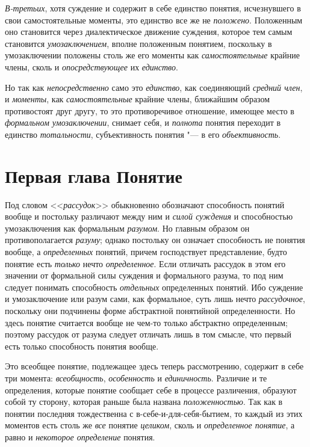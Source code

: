 {\em В-третьих}, хотя
суждение и содержит в себе единство понятия, исчезнувшего в свои
самостоятельные моменты, это единство все же не {\em положено}.
Положенным оно становится через диалектическое движение
суждения, которое тем самым становится {\em умозаключением},
вполне положенным понятием, поскольку в умозаключении
положены столь же его моменты как {\em самостоятельные}
крайние члены, сколь и {\em опосредствующее} их {\em единство}.

Но так как {\em непосредственно} само это {\em единство}, как соединяющий
{\em средний член}, и {\em моменты}, как {\em самостоятельные}
крайние члены, ближайшим образом противостоят друг другу, то
это противоречивое отношение, имеющее место в
{\em формальном умозаключении}, снимает себя, и {\em полнота} понятия
переходит в единство {\em тотальности},
субъективность понятия "--- в его {\em объективность}.

\bigskip

\chapter[{\em Первая глава} Понятие]{Первая глава Понятие}
Под словом <<{\em рассудок}>>
обыкновенно обозначают способность понятий вообще и постольку
различают между ним и {\em силой
суждения} и способностью умозаключения как формальным
{\em разумом}. Но главным
образом он противополагается
{\em разуму}; однако
постольку он означает способность не понятия вообще, а
{\em определенных}
понятий, причем господствует представление, будто понятие
есть {\em только} нечто
{\em определенное}. Если
отличать рассудок в этом его значении от формальной силы суждения и
формального разума, то под ним следует понимать способность
{\em отдельных}
определенных понятий. Ибо суждение и умозаключение или разум
сами, как формальное, суть лишь нечто
{\em рассудочное},
поскольку они подчинены форме абстрактной понятийной
определенности. Но здесь понятие считается вообще не чем-то только
абстрактно определенным; поэтому рассудок от разума следует отличать лишь в
том смысле, что первый есть только способность понятия вообще.

Это всеобщее понятие, подлежащее здесь теперь рассмотрению,
содержит в себе три момента:
{\em всеобщность},
{\em особенность} и
{\em единичность}.
Различие и те определения, которые понятие сообщает себе в
процессе различения, образуют собой ту сторону, которая раньше была названа
{\em положенностью}. Так
как в понятии последняя тождественна с в-себе-и-для-себя-бытием, то каждый
из этих моментов есть столь же
{\em все} понятие
{\em целиком}, сколь и
{\em определенное понятие},
а равно и {\em некоторое
определение} понятия.

